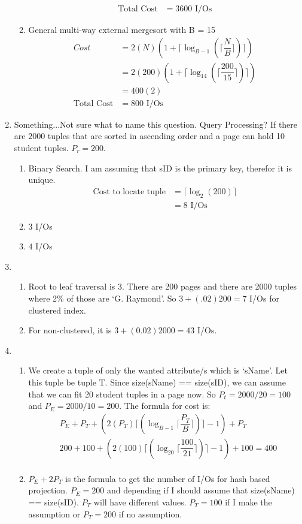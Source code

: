 \documentclass{report}
\begin{document}
\begin{enumerate}
\begin{enumerate}
\begin{align*}
				\text{Total Cost} &= 3600 \text{ I/Os}
			\end{align*}
			\item General multi-way external mergesort with B = 15
			\begin{align*}
				Cost &= 2(N)(1 + \lceil\log_{B-1}(\lceil\dfrac{N}{B}\rceil)\rceil) \\
				&= 2(200)(1 + \lceil\log_{14}(\lceil\dfrac{200}{15}\rceil)\rceil) \\
				&= 400(2) \\
				\text{Total Cost} &= 800 \text{ I/Os}
			\end{align*}
		\end{enumerate}
		\item Something...Not sure what to name this question. Query Processing?
		If there are $2000$ tuples that are sorted in ascending order and a page can hold 10 student tuples. $P_r = 200$.
		\begin{enumerate}
			\item Binary Search. I am assuming that sID is the primary key, therefor it is unique.
			\begin{align*}
				\text{Cost to locate tuple} &= \lceil \log_2(200) \rceil \\
				&= 8 \text{ I/Os}
			\end{align*}

			\item $3$ I/Os
			\item $4$ I/Os
		\end{enumerate}
		\item 
		\begin{enumerate}
			\item Root to leaf traversal is $3$. There are 200 pages and there are 2000 tuples where 2\% of those are `G. Raymond'. So $3 + (.02)200 = 7$ I/Os for clustered index.
			\item For non-clustered, it is $3 + (0.02)2000 = 43$ I/Os.
		\end{enumerate}
		\item 
		\begin{enumerate}
			\item We create a tuple of only the wanted attribute/s which is `sName'. Let this tuple be tuple T. Since size(sName) == size(sID), we can assume that we can fit 20 student tuples in a page now. So $P_t = 2000/20 = 100$ and $P_E = 2000/10 = 200$. The formula for cost is:
			\begin{align*}
				&P_E + P_T + ( 2(P_T) \lceil(\log_{B-1} \lceil\dfrac{P_T}{B}\rceil)\rceil - 1) + P_T \\
				&200 + 100 + ( 2(100) \lceil(\log_{20} \lceil\dfrac{100}{21}\rceil)\rceil -1 ) + 100 = 400 \\
			\end{align*}
			\item $P_E + 2 P_T$ is the formula to get the number of I/Os for hash based projection. $P_E = 200$ and depending if I should assume that size(sName) == size(sID). $P_T$ will have different values. $P_T = 100$ if I make the assumption or $P_T = 200$ if no assumption. \\


\end{enumerate}
\end{enumerate}
\end{document}
